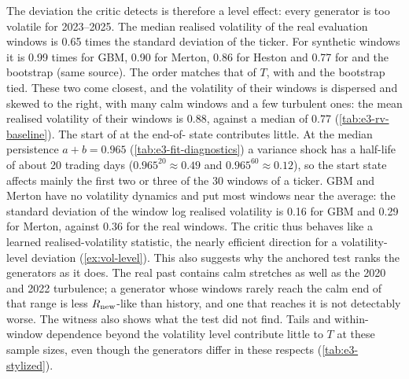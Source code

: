 The deviation the critic detects is therefore a level effect: every generator is too volatile
for 2023--2025. The median realised volatility of the real evaluation windows is 0.65 times the
\TRAIN{} standard deviation of the ticker. For synthetic windows it is 0.99 times for GBM, 0.90
for Merton, 0.86 for Heston and 0.77 for \GARCHt{} and the bootstrap (same source). The order
matches that of $T$, with \GARCHt{} and the bootstrap tied. These two come closest, and the
volatility of their windows is dispersed and skewed to the right, with many calm windows and a
few turbulent ones: the mean realised volatility of their windows is 0.88, against a median of
0.77 (\cref{tab:e3-rv-baseline}). The start of \GARCHt{} at the end-of-\TRAIN{} state contributes
little. At the median persistence $a+b=0.965$ (\cref{tab:e3-fit-diagnostics}) a variance shock
has a half-life of about 20 trading days ($0.965^{20}\approx0.49$ and $0.965^{60}\approx0.12$),
so the start state affects mainly the first two or three of the 30 \TEST{} windows of a ticker.
GBM and Merton have no volatility dynamics and put most windows near the \TRAIN{} average: the
standard deviation of the window log realised volatility is 0.16 for GBM and 0.29 for Merton,
against 0.36 for the real windows. The critic thus behaves like a learned realised-volatility
statistic, the nearly efficient direction for a volatility-level deviation (\cref{ex:vol-level}). This also suggests why the anchored test ranks the generators as it does. The
real past contains calm stretches as well as the 2020 and 2022 turbulence; a generator whose
windows rarely reach the calm end of that range is less $R_{\mathrm{new}}$-like than history, and one that
reaches it is not detectably worse. The
witness also shows what the test did not find. Tails and within-window dependence beyond the
volatility level contribute little to $T$ at these sample sizes, even though the generators
differ in these respects (\cref{tab:e3-stylized}).

